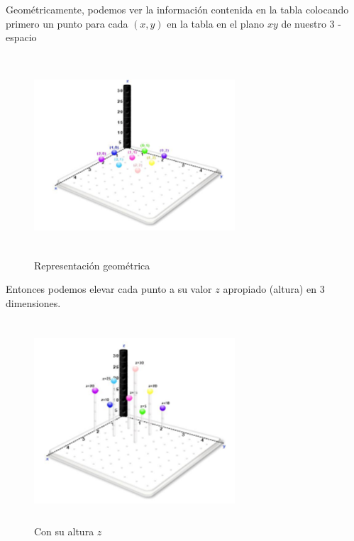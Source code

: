 Geométricamente, podemos ver la información contenida en la tabla colocando primero un punto para cada $(x, y)$ en la tabla en el plano $x y$ de nuestro 3 -espacio\par

\begin{figure}[htpb]
    \includegraphics[width=7.5cm, height=7.5cm]{imagenes/NImagen2.png}
    \caption{Representación geométrica}
\end{figure}
\newpage
Entonces podemos elevar cada punto a su valor $z$ apropiado (altura) en 3 dimensiones.\par

\begin{figure}[htpb]
    \includegraphics[width=7.5cm, height=7.5cm]{imagenes/Imagen3.png}
    \caption{Con su altura $z$}
\end{figure}

